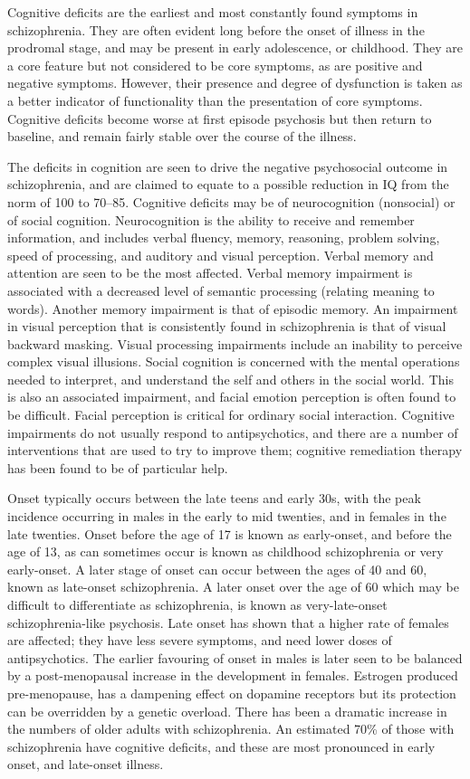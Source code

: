 Cognitive deficits are the earliest and most constantly found symptoms
in schizophrenia. They are often evident long before the onset of
illness in the prodromal stage, and may be present in early adolescence,
or childhood. They are a core feature but not considered to be core
symptoms, as are positive and negative symptoms. However, their presence
and degree of dysfunction is taken as a better indicator of
functionality than the presentation of core symptoms. Cognitive deficits
become worse at first episode psychosis but then return to baseline, and
remain fairly stable over the course of the illness.

The deficits in cognition are seen to drive the negative psychosocial
outcome in schizophrenia, and are claimed to equate to a possible
reduction in IQ from the norm of 100 to 70--85. Cognitive deficits may
be of neurocognition (nonsocial) or of social cognition. Neurocognition
is the ability to receive and remember information, and includes verbal
fluency, memory, reasoning, problem solving, speed of processing, and
auditory and visual perception. Verbal memory and attention are seen to
be the most affected. Verbal memory impairment is associated with a
decreased level of semantic processing (relating meaning to words).
Another memory impairment is that of episodic memory. An impairment in
visual perception that is consistently found in schizophrenia is that of
visual backward masking. Visual processing impairments include an
inability to perceive complex visual illusions. Social cognition is
concerned with the mental operations needed to interpret, and understand
the self and others in the social world. This is also an associated
impairment, and facial emotion perception is often found to be
difficult. Facial perception is critical for ordinary social
interaction. Cognitive impairments do not usually respond to
antipsychotics, and there are a number of interventions that are used to
try to improve them; cognitive remediation therapy has been found to be
of particular help.

Onset typically occurs between the late teens and early 30s, with the
peak incidence occurring in males in the early to mid twenties, and in
females in the late twenties. Onset before the age of 17 is known as
early-onset, and before the age of 13, as can sometimes occur is known
as childhood schizophrenia or very early-onset. A later stage of onset
can occur between the ages of 40 and 60, known as late-onset
schizophrenia. A later onset over the age of 60 which may be difficult
to differentiate as schizophrenia, is known as very-late-onset
schizophrenia-like psychosis. Late onset has shown that a higher rate of
females are affected; they have less severe symptoms, and need lower
doses of antipsychotics. The earlier favouring of onset in males is
later seen to be balanced by a post-menopausal increase in the
development in females. Estrogen produced pre-menopause, has a dampening
effect on dopamine receptors but its protection can be overridden by a
genetic overload. There has been a dramatic increase in the numbers of
older adults with schizophrenia. An estimated 70\% of those with
schizophrenia have cognitive deficits, and these are most pronounced in
early onset, and late-onset illness.

